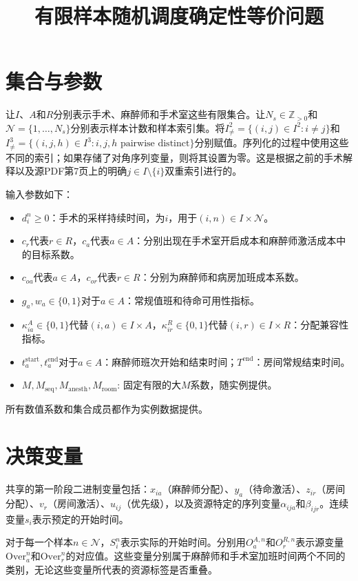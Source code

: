 \documentclass[11pt,a4paper]{article}
\title{有限样本随机调度确定性等价问题}
\author{}
\date{}
\begin{document}
\maketitle

\section*{集合与参数}
让$I$、$A$和$R$分别表示手术、麻醉师和手术室这些有限集合。让$N_s\in\mathbb{Z}_{>0}$和$\mathcal{N}=\{1,\ldots,N_s\}$分别表示样本计数和样本索引集。将$I^2_{\ne}=\{(i,j)\in I^2:i\ne j\}$和$I^3_{\ne}=\{(i,j,h)\in I^3:i,j,h\text{ pairwise distinct}\}$分别赋值。序列化的过程中使用这些不同的索引；如果存储了对角序列变量，则将其设置为零。这是根据之前的手术解释以及源PDF第7页上的明确$j\in I\setminus\{i\}$双重索引进行的。

输入参数如下：
\begin{itemize}
\item $d_i^n\geq 0$：手术的采样持续时间，为$i$，用于$(i,n)\in I\times\mathcal{N}$。
\item $c_r$代表$r\in R$，$c_a$代表$a\in A$：分别出现在手术室开启成本和麻醉师激活成本中的目标系数。
\item $c_{oa}$代表$a\in A$，$c_{or}$代表$r\in R$：分别为麻醉师和病房加班成本系数。
\item $g_a,w_a\in\{0,1\}$对于$a\in A$：常规值班和待命可用性指标。
\item $\kappa^A_{ia}\in\{0,1\}$代替$(i,a)\in I\times A$，$\kappa^R_{ir}\in\{0,1\}$代替$(i,r)\in I\times R$：分配兼容性指标。
\item $t_a^{\mathrm{start}},t_a^{\mathrm{end}}$对于$a\in A$：麻醉师班次开始和结束时间；$T^{\mathrm{end}}$：房间常规结束时间。
\item $M,M_{\mathrm{seq}},M_{\mathrm{anesth}},M_{\mathrm{room}}$: 固定有限的大$M$系数，随实例提供。
\end{itemize}
所有数值系数和集合成员都作为实例数据提供。

\section*{决策变量}
共享的第一阶段二进制变量包括：$x_{ia}$（麻醉师分配）、$y_a$（待命激活）、$z_{ir}$（房间分配）、$v_r$（房间激活）、$u_{ij}$（优先级），以及资源特定的序列变量$\alpha_{ija}$和$\beta_{ijr}$。连续变量$s_i$表示预定的开始时间。

对于每一个样本$n\in\mathcal{N}$，$S_i^n$表示实际的开始时间。分别用$O_a^{A,n}$和$O_r^{R,n}$表示源变量$\mathrm{Over}_a^n$和$\mathrm{Over}_r^n$的对应值。这些变量分别属于麻醉师和手术室加班时间两个不同的类别，无论这些变量所代表的资源标签是否重叠。
\end{document}
